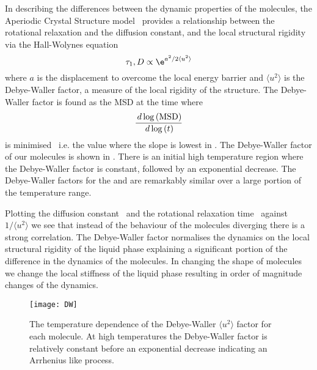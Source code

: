 In describing the differences between the dynamic properties of the molecules, the Aperiodic Crystal Structure model~\cite{hall:87} provides a relationship between the rotational relaxation and the diffusion constant, and the local structural rigidity via the Hall-Wolynes equation~\cite{hall:87,dyre:96}
\begin{equation}
    \tau_1, D \propto \e^{a^2/2\langle u^2\rangle}
\end{equation}
where $a$ is the displacement to overcome the local energy barrier and $\langle u^2 \rangle$ is the Debye-Waller factor, a measure of the local rigidity of the structure. The Debye-Waller factor is found as the MSD at the time where 
\begin{equation}
    \frac{\,d \log{(\text{MSD})}}{\,d \log{(t)}}
\end{equation}
is minimised~\cite{larini:08} i.e. the value where the slope is lowest in . The Debye-Waller factor of our molecules is shown in . There is an initial high temperature region where the Debye-Waller factor is constant, followed by an exponential decrease. The Debye-Waller factors for the \dcon and \tri are remarkably similar over a large portion of the temperature range.

Plotting the diffusion constant~ and the rotational relaxation time~ against $1/\langle u^2 \rangle$ we see that instead of the behaviour of the molecules diverging there is a strong correlation. The Debye-Waller factor normalises the dynamics on the local structural rigidity of the liquid phase explaining a significant portion of the difference in the dynamics of the molecules. In changing the shape of molecules we change the local stiffness of the liquid phase resulting in order of magnitude changes of the dynamics.


\begin{figure}
    \centering
    \texttt{[image: DW]}
    \caption{The temperature dependence of the Debye-Waller $\langle u^2 \rangle$ factor for each molecule. At high temperatures the Debye-Waller factor is relatively constant before an exponential decrease indicating an Arrhenius like process.}
    \label{fig:DW}
\end{figure}

